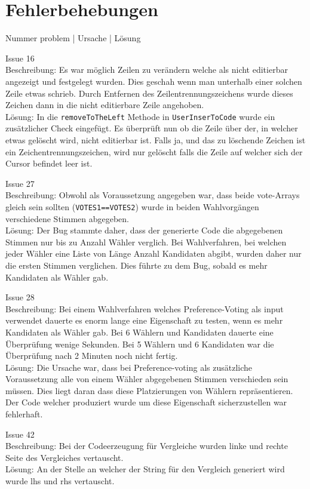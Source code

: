 ﻿\documentclass[a4paper]{scrreprt}
\begin{document}
\chapter{Fehlerbehebungen}

Nummer problem | Ursache | Lösung

Issue 16\\
Beschreibung: Es war möglich Zeilen zu verändern welche als nicht editierbar angezeigt und festgelegt wurden. Dies geschah wenn man unterhalb einer solchen Zeile etwas schrieb. Durch Entfernen des Zeilentrennungszeichens wurde dieses Zeichen dann in die nicht editierbare Zeile angehoben.\\
Lösung: In die \verb!removeToTheLeft! Methode in \verb!UserInserToCode! wurde ein zusätzlicher Check eingefügt. Es überprüft nun ob die Zeile über der, in welcher etwas gelöscht wird, nicht editierbar ist. Falls ja, und das zu löschende Zeichen ist ein Zeichentrennungszeichen, wird nur gelöscht falls die Zeile auf welcher sich der Cursor befindet leer ist.

Issue 27\\
Beschreibung: Obwohl als Voraussetzung angegeben war, dass beide vote-Arrays gleich sein sollten (\verb!VOTES1==VOTES2!) wurde in beiden Wahlvorgängen verschiedene Stimmen abgegeben.\\
Lösung: Der Bug stammte daher, dass der generierte Code die abgegebenen Stimmen nur bis zu Anzahl Wähler verglich. Bei Wahlverfahren, bei welchen jeder Wähler eine Liste von Länge Anzahl Kandidaten abgibt, wurden daher nur die ersten Stimmen verglichen. Dies führte zu dem Bug, sobald es mehr Kandidaten als Wähler gab.

Issue 28\\
Beschreibung: Bei einem Wahlverfahren welches Preference-Voting als input verwendet dauerte es enorm lange eine Eigenschaft zu testen, wenn es mehr Kandidaten als Wähler gab. Bei 6 Wählern und Kandidaten dauerte eine Überprüfung wenige Sekunden. Bei 5 Wählern und 6 Kandidaten war die Überprüfung nach 2 Minuten noch nicht fertig.\\
Lösung: Die Ursache war, dass bei Preference-voting als zusätzliche Voraussetzung alle von einem Wähler abgegebenen Stimmen verschieden sein müssen. Dies liegt daran dass diese Platzierungen von Wählern repräsentieren. Der Code welcher produziert wurde um diese Eigenschaft sicherzustellen war fehlerhaft.

Issue 42\\
Beschreibung: Bei der Codeerzeugung für Vergleiche wurden linke und rechte Seite des Vergleiches vertauscht.\\
Lösung: An der Stelle an welcher der String für den Vergleich generiert wird wurde lhs und rhs vertauscht. 
 
\end{document}
